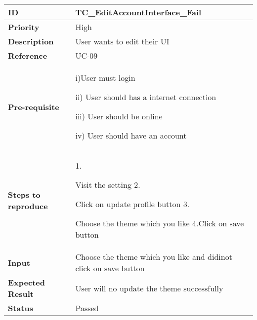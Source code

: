 \begin{center}
    \begin{tabularx}{\textwidth}{|l|X|}
        \hline
        \textbf{ID}                 & TC\_EditAccountInterface\_Fail                                   \\
        \hline
        \textbf{Priority}           & High                                                             \\
        \hline
        \textbf{Description}        & User wants to edit their UI                                      \\
        \hline
        \textbf{Reference}          & UC-09                                                            \\
        \hline
        \textbf{Pre-requisite}      & i)User must login

        ii) User should has a internet connection

        iii) User should be online

        iv) User should have an account                                                                \\
        \hline
        \textbf{Steps to reproduce} & 1.

        Visit the setting 2.

        Click on update profile button 3.

        Choose the theme which you like 4.Click on save button                                         \\
        \hline
        \textbf{Input}              & Choose the theme which you like and didinot click on save button \\
        \hline
        \textbf{Expected Result}    & User will no update the theme successfully                       \\
        \hline
        \textbf{Status}             & Passed                                                           \\
        \hline
    \end{tabularx}
\end{center}
\newpage


